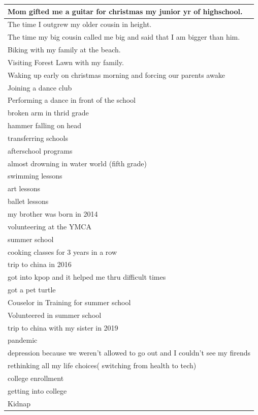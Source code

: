 \documentclass[
  .7em,
  letterpaper,
  DIV=11,
  numbers=noendperiod]{scrartcl}
\begin{document}
\begin{table}
\begin{tabular}{l}
\hline
Mom gifted me a guitar for christmas my junior yr of highschool.\\
\hline
The time I outgrew my older cousin in height.\\
\hline
The time my big cousin called me big and said that I am bigger than him.\\
\hline
Biking with my family at the beach.\\
\hline
Visiting Forest Lawn with my family.\\
\hline
Waking up early on christmas morning and forcing our parents awake\\
\hline
Joining a dance club\\
\hline
Performing a dance in front of the school\\
\hline
broken arm in thrid grade\\
\hline
hammer falling on head\\
\hline
transferring schools\\
\hline
afterschool programs\\
\hline
almost drowning in water world (fifth grade)\\
\hline
swimming lessons\\
\hline
art lessons\\
\hline
ballet lessons\\
\hline
my brother was born in 2014\\
\hline
volunteering at the YMCA\\
\hline
summer school\\
\hline
cooking classes for 3 years in a row\\
\hline
trip to china in 2016\\
\hline
got into kpop and it helped me thru difficult times\\
\hline
got a pet turtle\\
\hline
Couselor in Training for summer school\\
\hline
Volunteered in summer school\\
\hline
trip to china with my sister in 2019\\
\hline
pandemic\\
\hline
depression because we weren't allowed to go out and I couldn't see my firends\\
\hline
rethinking all my life choices( switching from health to tech)\\
\hline
college enrollment\\
\hline
getting into college\\
\hline
Kidnap\\

\end{tabular}
\end{table}
\end{document}
